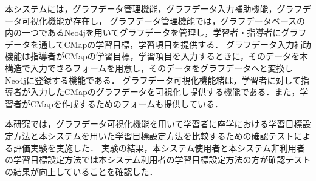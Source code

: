 \begin{titlepage}
    本システムには，グラフデータ管理機能，グラフデータ入力補助機能，グラフデータ可視化機能が存在し，
    グラフデータ管理機能では，グラフデータベースの内の一つであるNeo4jを用いてグラフデータを管理し，学習者・指導者にグラフデータを通してCMapの学習目標，学習項目を提供する．
    グラフデータ入力補助機能は指導者がCMapの学習目標，学習項目を入力するときに，そのデータを木構造で入力できるフォームを用意し，そのデータをグラフデータへと変換しNeo4jに登録する機能である．
    グラフデータ可視化機能緒は，学習者に対して指導者が入力したCMapのグラフデータを可視化し提供する機能である．また，学習者がCMapを作成するためのフォームも提供している．

    本研究では，グラフデータ可視化機能を用いて学習者に座学における学習目標設定方法と本システムを用いた学習目標設定方法を比較するための確認テストによる評価実験を実施した．
    実験の結果，本システム使用者と本システム非利用者の学習目標設定方法では本システム利用者の学習目標設定方法の方が確認テストの結果が向上していることを確認した．
\end{titlepage}
